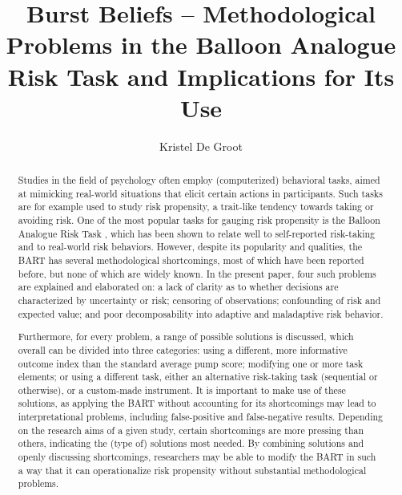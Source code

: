 \documentclass[serif, twocolumn, authordate, meta]{jote-article}
\title{Burst Beliefs – Methodological Problems in the Balloon Analogue Risk Task and Implications for Its Use}
\author[1]{Kristel De Groot}
\affil[1]{Erasmus University Rotterdam Institute for Behaviour and Biology (EURIBEB) |\newline Institute of Psychology, Erasmus School of Social and Behavioural Sciences |\newline Department of Applied Economics, Erasmus School of Economics;\newline Erasmus University Rotterdam, the Netherlands}
\begin{document}
\setcounter{page}{43}
\begin{frontmatter}
\maketitle 
\begin{abstract}

\noindent Studies in the field of psychology often employ (computerized) behavioral tasks, aimed at mimicking real-world situations that elicit certain actions in participants. Such tasks are for example used to study risk propensity, a trait-like tendency towards taking or avoiding risk. One of the most popular tasks for gauging risk propensity is the Balloon Analogue Risk Task \parencite[BART;][]{Lejuez2002}, which has been shown to relate well to self-reported risk-taking and to real-world risk behaviors. However, despite its popularity and qualities, the BART has several methodological shortcomings, most of which have been reported before, but none of which are widely known. In the present paper, four such problems are explained and elaborated on: a lack of clarity as to whether decisions are characterized by uncertainty or risk; censoring of observations; confounding of risk and expected value; and poor decomposability into adaptive and maladaptive risk behavior.

Furthermore, for every problem, a range of possible solutions is discussed, which overall can be divided into three categories: using a different, more informative outcome index than the standard average pump score; modifying one or more task elements; or using a different task, either an alternative risk-taking task (sequential or otherwise), or a custom-made instrument. It is important to make use of these solutions, as applying the BART without accounting for its shortcomings may lead to interpretational problems, including false-positive and false-negative results. Depending on the research aims of a given study, certain shortcomings are more pressing than others, indicating the (type of) solutions most needed. By combining solutions and openly discussing shortcomings, researchers may be able to modify the BART in such a way that it can operationalize risk propensity without substantial methodological problems.
\end{abstract}
\end{frontmatter}
\end{document}
